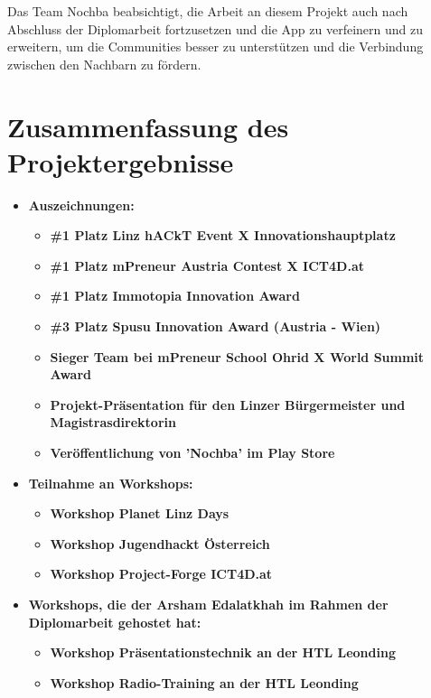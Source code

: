 Das Team Nochba beabsichtigt, die Arbeit an diesem Projekt auch nach Abschluss der Diplomarbeit fortzusetzen und die App zu verfeinern und zu erweitern, um die Communities besser zu unterstützen und die Verbindung zwischen den Nachbarn zu fördern.

\section{Zusammenfassung des Projektergebnisse}

\begin{itemize}
    \item \textbf{Auszeichnungen:}
          \begin{itemize}
              \item \textbf{\#1 Platz Linz hACkT Event X Innovationshauptplatz}
              \item \textbf{\#1 Platz mPreneur Austria Contest X ICT4D.at}
              \item \textbf{\#1 Platz Immotopia Innovation Award}
              \item \textbf{\#3 Platz Spusu Innovation Award (Austria - Wien)}
              \item \textbf{Sieger Team bei mPreneur School Ohrid X World Summit Award}
              \item \textbf{Projekt-Präsentation für den Linzer Bürgermeister und Magistrasdirektorin}
              \item \textbf{Veröffentlichung von 'Nochba' im Play Store}
          \end{itemize}
    \item \textbf{Teilnahme an Workshops:}
          \begin{itemize}
              \item \textbf{Workshop Planet Linz Days}
              \item \textbf{Workshop Jugendhackt Österreich}
              \item \textbf{Workshop Project-Forge ICT4D.at}
          \end{itemize}
    \item \textbf{Workshops, die der Arsham Edalatkhah im Rahmen der Diplomarbeit gehostet hat:}
          \begin{itemize}
              \item \textbf{Workshop Präsentationstechnik an der HTL Leonding}
              \item \textbf{Workshop Radio-Training an der HTL Leonding}

\end{itemize}
\end{itemize}
